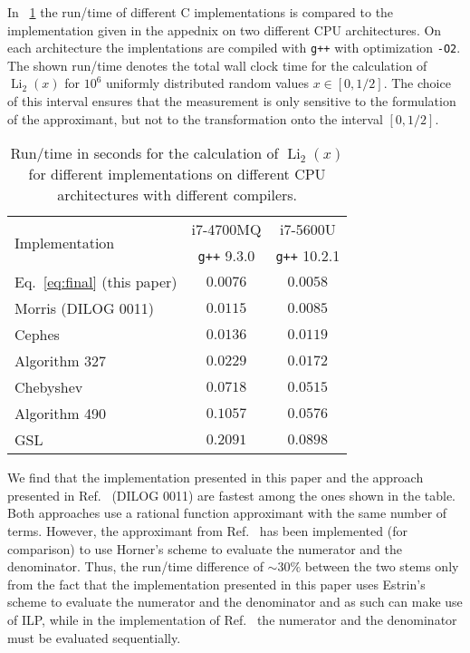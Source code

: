 \documentclass[10pt,DIV16,twocolumn,numbers=noenddot]{scrartcl}
\newcommand{\Li}{\operatorname{Li}_2}
\newcommand{\tabref}[1]{\tablename~\ref{#1}}
\begin{document}
In \tabref{tab:runtime} the run\-/time of different C implementations is
compared to the implementation given in the appednix on two different
CPU architectures.  On each architecture the implentations are
compiled with \texttt{g++} with optimization \texttt{-O2}.  The shown
run\-/time denotes the total wall clock time for the calculation of
$\Li(x)$ for $10^6$ uniformly distributed random values $x\in[0,1/2]$.
The choice of this interval ensures that the measurement is only
sensitive to the formulation of the approximant, but not to the
transformation onto the interval $[0,1/2]$.%
%
\begin{table}[tb]
  \centering
  \caption{Run\-/time in seconds for the calculation of $\Li(x)$ for
    different implementations on different CPU architectures with
    different compilers.}
  \begin{tabular}{lcc}
    \toprule
    \multirow{2}{*}{Implementation} & i7-4700MQ & i7-5600U \\
    & \texttt{g++} 9.3.0 & \texttt{g++} 10.2.1 \\
    \midrule
    Eq.~\eqref{eq:final} (this paper) & $0.0076$ & $0.0058$ \\
    Morris (DILOG 0011) \cite{morris} & $0.0115$ & $0.0085$ \\
    Cephes \cite{cephes}              & $0.0136$ & $0.0119$ \\
    Algorithm 327 \cite{koelbigDilog} & $0.0229$ & $0.0172$ \\
    Chebyshev \cite{luke,root}        & $0.0718$ & $0.0515$ \\
    Algorithm 490 \cite{ginsberg}     & $0.1057$ & $0.0576$ \\
    GSL \cite{gsl}                    & $0.2091$ & $0.0898$ \\
    \bottomrule
  \end{tabular}
  \label{tab:runtime}
\end{table}%

We find that the implementation presented in this paper and the
approach presented in Ref.~\cite{morris} (DILOG 0011) are fastest
among the ones shown in the table.  Both approaches use a rational
function approximant with the same number of terms.  However, the
approximant from Ref.~\cite{morris} has been implemented (for
comparison) to use Horner's scheme to evaluate the numerator and the
denominator.  Thus, the run\-/time difference of $\sim 30\%$ between
the two stems only from the fact that the implementation presented
in this paper uses Estrin's scheme to evaluate the numerator and the
denominator and as such can make use of ILP, while in the
implementation of Ref.~\cite{morris} the numerator and the denominator
must be evaluated sequentially.
\end{document}
